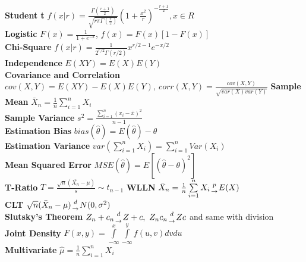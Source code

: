 \documentclass[3pt, a4paper]{article}
\begin{document}
    \textbf{Student t} $f(x|r) = \frac{\Gamma(\frac{r+1}{2})}{\sqrt{r\pi\Gamma(\frac{r}{2})}}(1+\frac{x^2}{r})^{-\frac{r+1}{2}}, x\in R$\\
    \textbf{Logistic} $F(x) = \frac{1}{1+e^{-x}}$, $f(x) = F(x)[1-F(x)]$\\
    \textbf{Chi-Square} $f(x|r)=\frac{1}{2^{r/2}\Gamma(r/2)}x^{r/2-1}e^{-x/2}$\\
    \textbf{Independence} $E(XY)=E(X)E(Y)$\\
    \textbf{Covariance and Correlation} $cov(X,Y)=E(XY)-E(X)E(Y),\ corr(X,Y)=\frac{cov(X,Y)}{\sqrt{var(X)var(Y)}}$
    \textbf{Sample Mean} $\bar X_n=\frac{1}{n}\sum\limits^n_{i=1}X_i$\\
    \textbf{Sample Variance} $s^2=\frac{\sum\limits^n_{i=1}(x_i-\bar{x})^2}{n-1}$\\
    \textbf{Estimation Bias} $bias(\hat{\theta})=E(\hat{\theta})-\theta$\\
    \textbf{Estimation Variance} $var(\sum\limits^n_{i=1}X_i)=\sum\limits^n_{i=1}Var(X_i)$\\
    \textbf{Mean Squared Error} $MSE(\hat{\theta})=E[(\hat{\theta}-\theta)^2]$\\
    \textbf{T-Ratio} $T = \frac{\sqrt{n}(\bar{X_n}-\mu)}{s}\sim t_{n-1}$
    \textbf{WLLN} $\bar{X}_n=\frac{1}{n}\sum\limits^n_{i=1}X_i{p\atop\rightarrow}E(X)$\\
    \textbf{CLT} $\sqrt{n}(\bar{X}_n-\mu){d\atop\rightarrow}N(0,\sigma^2)$\\
    \textbf{Slutsky's Theorem} $Z_n+c_n{d\atop\rightarrow}Z+c,\ Z_nc_n{d\atop\rightarrow}Zc$ and same with division\\ 
    \textbf{Joint Density} $F(x,y) = \int\limits_{-\infty}^x\int\limits_{-\infty}^yf(u,v)dvdu$\\
    \textbf{Multivariate} $\hat{\mu}=\frac{1}{n}\sum^n_{i=1}X_i$
\end{document}
